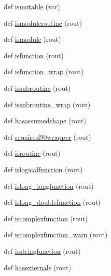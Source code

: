 \begin{DoxyCompactItemize}
def \hyperlink{namespacenumpy_1_1f2py_1_1auxfuncs_aa96238a6bebc6cd6f2f44b2ccbcb9723}{ismutable} (var)
\item 
def \hyperlink{namespacenumpy_1_1f2py_1_1auxfuncs_a9f6accf48ba45883826c03fc20a88b0b}{ismoduleroutine} (rout)
\item 
def \hyperlink{namespacenumpy_1_1f2py_1_1auxfuncs_adebdd297872136f63804a7fc53fb92ae}{ismodule} (rout)
\item 
def \hyperlink{namespacenumpy_1_1f2py_1_1auxfuncs_aaedc48816b715c5cf7e790a18b4e7b24}{isfunction} (rout)
\item 
def \hyperlink{namespacenumpy_1_1f2py_1_1auxfuncs_a38d3c804529845af6b12efcf2130c22f}{isfunction\+\_\+wrap} (rout)
\item 
def \hyperlink{namespacenumpy_1_1f2py_1_1auxfuncs_a34f535465eef72ee08b195bd4b1dd732}{issubroutine} (rout)
\item 
def \hyperlink{namespacenumpy_1_1f2py_1_1auxfuncs_a3290446fe53feb8814bc250e7dd0b7fd}{issubroutine\+\_\+wrap} (rout)
\item 
def \hyperlink{namespacenumpy_1_1f2py_1_1auxfuncs_a43fab72b465cc80b23bb4051f8a2982d}{hasassumedshape} (rout)
\item 
def \hyperlink{namespacenumpy_1_1f2py_1_1auxfuncs_aa42c9e98c7e77db6064422f1bcc0473b}{requiresf90wrapper} (rout)
\item 
def \hyperlink{namespacenumpy_1_1f2py_1_1auxfuncs_ab1683193ae6d62d009bbae564d6cf2d2}{isroutine} (rout)
\item 
def \hyperlink{namespacenumpy_1_1f2py_1_1auxfuncs_aabda47ed05b89acd9ae8c186acdc943c}{islogicalfunction} (rout)
\item 
def \hyperlink{namespacenumpy_1_1f2py_1_1auxfuncs_a43a184d0774b4dd7183b593b8369e7e2}{islong\+\_\+longfunction} (rout)
\item 
def \hyperlink{namespacenumpy_1_1f2py_1_1auxfuncs_afb0f0986dda5eedac61399607a713b43}{islong\+\_\+doublefunction} (rout)
\item 
def \hyperlink{namespacenumpy_1_1f2py_1_1auxfuncs_ab3009dec304c94331160d1b27da5368a}{iscomplexfunction} (rout)
\item 
def \hyperlink{namespacenumpy_1_1f2py_1_1auxfuncs_ae5bd390bc78ce1d81922c392677fee10}{iscomplexfunction\+\_\+warn} (rout)
\item 
def \hyperlink{namespacenumpy_1_1f2py_1_1auxfuncs_a23d130630c16f6a50ad4770ff8fd10d5}{isstringfunction} (rout)
\item 
def \hyperlink{namespacenumpy_1_1f2py_1_1auxfuncs_a4863dc44176d244b65d25b98b89c10e5}{hasexternals} (rout)

\end{DoxyCompactItemize}
